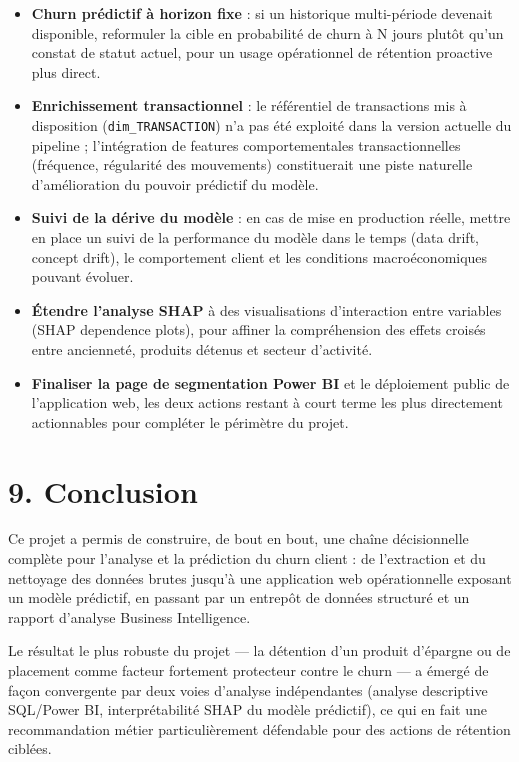 \documentclass[11pt,a4paper]{article}
\providecommand{\tightlist}{\setlength{\itemsep}{0pt}\setlength{\parskip}{0pt}}
\begin{document}
\begin{itemize}
\tightlist
\item
  \textbf{Churn prédictif à horizon fixe} : si un historique
  multi-période devenait disponible, reformuler la cible en probabilité
  de churn à N jours plutôt qu'un constat de statut actuel, pour un
  usage opérationnel de rétention proactive plus direct.
\item
  \textbf{Enrichissement transactionnel} : le référentiel de
  transactions mis à disposition (\texttt{dim\_\hspace{0pt}TRANSACTION})
  n'a pas été exploité dans la version actuelle du pipeline ;
  l'intégration de features comportementales transactionnelles
  (fréquence, régularité des mouvements) constituerait une piste
  naturelle d'amélioration du pouvoir prédictif du modèle.
\item
  \textbf{Suivi de la dérive du modèle} : en cas de mise en production
  réelle, mettre en place un suivi de la performance du modèle dans le
  temps (data drift, concept drift), le comportement client et les
  conditions macroéconomiques pouvant évoluer.
\item
  \textbf{Étendre l'analyse SHAP} à des visualisations d'interaction
  entre variables (SHAP dependence plots), pour affiner la compréhension
  des effets croisés entre ancienneté, produits détenus et secteur
  d'activité.
\item
  \textbf{Finaliser la page de segmentation Power BI} et le déploiement
  public de l'application web, les deux actions restant à court terme
  les plus directement actionnables pour compléter le périmètre du
  projet.
\end{itemize}

\newpage

\hypertarget{conclusion}{%
\section{9. Conclusion}\label{conclusion}}

Ce projet a permis de construire, de bout en bout, une chaîne
décisionnelle complète pour l'analyse et la prédiction du churn client :
de l'extraction et du nettoyage des données brutes jusqu'à une
application web opérationnelle exposant un modèle prédictif, en passant
par un entrepôt de données structuré et un rapport d'analyse Business
Intelligence.

Le résultat le plus robuste du projet --- la détention d'un produit
d'épargne ou de placement comme facteur fortement protecteur contre le
churn --- a émergé de façon convergente par deux voies d'analyse
indépendantes (analyse descriptive SQL/Power BI, interprétabilité SHAP
du modèle prédictif), ce qui en fait une recommandation métier
particulièrement défendable pour des actions de rétention ciblées.
\end{document}
